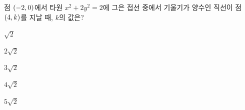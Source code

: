 점 $(-2{,}\mkern3mu\mathopen{}0)$에서 타원 $x^2+2y^2=2$에 그은 접선 중에서 기울기가 양수인 직선이 점 $(4{,}\mkern3mu\mathopen{}k)$를 지날 때, $k$의 값은?
\begin{choices32}{\rule[-3ex]{0pt}{8ex}$\sqrt{2}$}{\rule[-3ex]{0pt}{8ex}$2\sqrt{2}$}{\rule[-3ex]{0pt}{8ex}$3\sqrt{2}$}{\rule[-3ex]{0pt}{8ex}$4\sqrt{2}$}{\rule[-3ex]{0pt}{8ex}$5\sqrt{2}$}\end{choices32}
